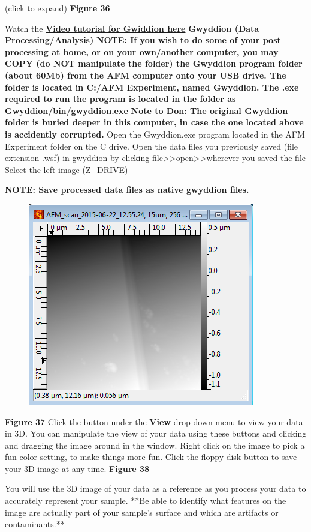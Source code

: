 \documentclass{../lab}
\begin{document}
 (click to expand)
\textbf{Figure 36}

Watch the \href{http://experimentationlab.berkeley.edu/sites/default/files/AFMImages/gwyddion1.mp4.mp4}{\textbf{Video tutorial for Gwiddion here}}
\textbf{Gwyddion (Data Processing/Analysis)}
\textbf{NOTE: If you wish to do some of your post processing at home, or on your own/another computer, you may COPY (do NOT manipulate the folder) the Gwyddion program folder (about 60Mb) from the AFM computer onto your USB drive.  The folder is located in C:/AFM Experiment, named Gwyddion.  The .exe required to run the program is located in the folder as Gwyddion/bin/gwyddion.exe}
\textbf{Note to Don: The original Gwyddion folder is buried deeper in this computer, in case the one located above is accidently corrupted.}
Open the Gwyddion.exe program located in the AFM Experiment folder on the C drive.
Open the data files you previously saved (file extension .wsf) in gwyddion by clicking file>>open>>wherever you saved the file
Select the left image (Z\_DRIVE)

\textbf{NOTE: Save processed data files as native gwyddion files.}

\begin{figure}[h]
    \centering
    \href{http://dev-physicsadv.pantheon.berkeley.edu/sites/default/files/AFMImages/40.png}{\includegraphics[width=0.5\linewidth]{images/40.png}}
    \caption{}
    \label{fig:40}
\end{figure}


\textbf{Figure 37}
Click the  button under the \textbf{View} drop down menu to view your data in 3D.
You can manipulate the view of your data using these buttons and clicking and dragging the image around in the window.
Right click on the image to pick a fun color setting, to make things more fun.
Click the floppy disk button to save your 3D image at any time.
\textbf{Figure 38}

You will use the 3D image of your data as a reference as you process your data to accurately represent your sample.
**Be able to identify what features on the image are actually part of your sample's surface and which are artifacts or contaminants.**
\end{document}
